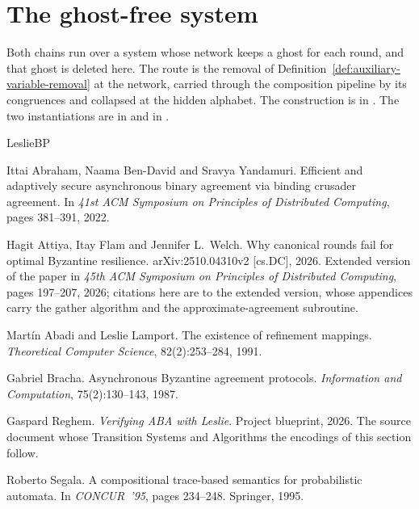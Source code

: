 

\section{The ghost-free system}

Both chains run over a system whose network keeps a ghost for each round, and that ghost is deleted here.
The route is the removal of Definition~\ref{def:auxiliary-variable-removal} at the network, carried through the composition pipeline by its congruences and collapsed at the hidden alphabet.
The construction is in .
The two instantiations are in  and in .




\begin{thebibliography}{LeslieBP}

Ittai Abraham, Naama Ben-David and Sravya Yandamuri.
Efficient and adaptively secure asynchronous binary agreement via binding crusader agreement.
In \emph{41st ACM Symposium on Principles of Distributed Computing}, pages 381--391, 2022.

Hagit Attiya, Itay Flam and Jennifer L.\ Welch.
Why canonical rounds fail for optimal Byzantine resilience.
arXiv:2510.04310v2 [cs.DC], 2026.
Extended version of the paper in \emph{45th ACM Symposium on Principles of Distributed Computing}, pages 197--207, 2026;
citations here are to the extended version, whose appendices carry the gather algorithm and the approximate-agreement subroutine.

Mart\'in Abadi and Leslie Lamport.
The existence of refinement mappings.
\emph{Theoretical Computer Science}, 82(2):253--284, 1991.

Gabriel Bracha.
Asynchronous Byzantine agreement protocols.
\emph{Information and Computation}, 75(2):130--143, 1987.

Gaspard Reghem.
\emph{Verifying ABA with Leslie}.
Project blueprint, 2026. The source document whose Transition Systems and Algorithms the encodings of this section follow.

Roberto Segala.
A compositional trace-based semantics for probabilistic automata.
In \emph{CONCUR~'95}, pages 234--248. Springer, 1995.

\end{thebibliography}
